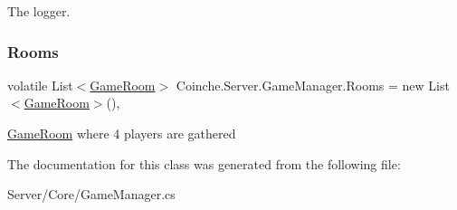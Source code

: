 The logger.\mbox{\label{class_coinche_1_1_server_1_1_game_manager_abf914b45ad131ab37252a63d3c23ac39}} 
\subsubsection{\texorpdfstring{Rooms}{Rooms}}
{\footnotesize\ttfamily volatile List$<$\hyperlink{class_coinche_1_1_server_1_1_game_room}{Game\+Room}$>$ Coinche.\+Server.\+Game\+Manager.\+Rooms = new List$<$\hyperlink{class_coinche_1_1_server_1_1_game_room}{Game\+Room}$>$()\hspace{0.3cm}{\ttfamily [static]}, {\ttfamily [private]}}



\hyperlink{class_coinche_1_1_server_1_1_game_room}{Game\+Room} where 4 players are gathered 



The documentation for this class was generated from the following file\+:\begin{DoxyCompactItemize}
\item 
Server/\+Core/Game\+Manager.\+cs\end{DoxyCompactItemize}
